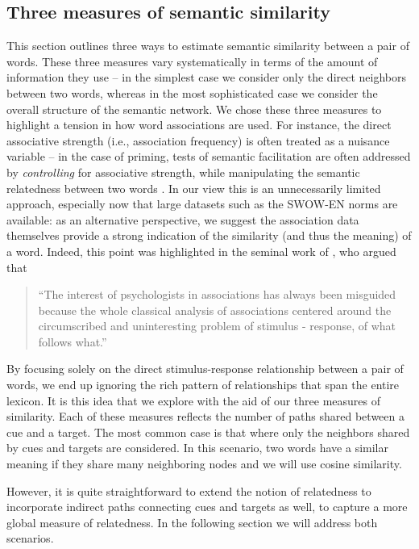 \documentclass[a4paper,doc,natbib,floatsintext]{apa6}
\begin{document}
\subsection{Three measures of semantic similarity}

This section outlines three ways to estimate semantic similarity between a pair of words. These three measures vary systematically in terms of the amount of information they use -- in the simplest case we consider only the direct neighbors between two words, whereas in the most sophisticated case we consider the overall structure of the semantic network. We chose these three measures to highlight a tension in how word associations are used. For instance, the direct associative strength (i.e., association frequency) is often treated as a nuisance variable -- in the case of priming, tests of semantic facilitation are often addressed by \textit{controlling} for associative strength, while manipulating the semantic relatedness between two words \cite[see][for an extensive overview]{Hutchison2003}. In our view this is an unnecessarily limited approach, especially now that large datasets such as the SWOW-EN norms are available: as an alternative perspective, we suggest the association data themselves provide a strong indication of the similarity (and thus the meaning) of a word. Indeed, this point was highlighted in the seminal work of \citet[][p vii]{Deese1965}, who argued that
\begin{quote}
``The interest of psychologists in associations has always been misguided because the whole classical analysis of associations centered around the circumscribed and uninteresting problem of stimulus - response, of what follows what.''
\end{quote}
By focusing solely on the direct stimulus-response relationship between a pair of words, we end up ignoring the rich pattern of relationships that span the entire lexicon. It is this idea that we explore with the aid of our three measures of similarity.
Each of these measures reflects the number of paths shared between a cue and a target. The most common case is that where only the neighbors shared by cues and targets are considered. In this scenario, two words have a similar meaning if they share many neighboring nodes and we will use cosine similarity.

However, it is quite straightforward to extend the notion of relatedness to incorporate indirect paths connecting cues and targets as well, to capture a more global measure of relatedness. In the following section we will address both scenarios.
\end{document}
